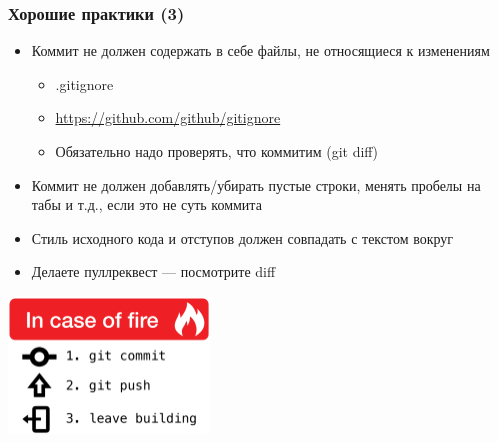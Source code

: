 \documentclass{../../slides-style}
\begin{document}
    \begin{frame}
        \frametitle{Хорошие практики (3)}
        \begin{itemize}
            \item Коммит не должен содержать в себе файлы, не относящиеся к изменениям
            \begin{itemize}
                \item .gitignore
                \item \url{https://github.com/github/gitignore}
                \item Обязательно надо проверять, что коммитим (git diff)
            \end{itemize}
            \item Коммит не должен добавлять/убирать пустые строки, менять пробелы на табы и т.д., если это не суть коммита
            \item Стиль исходного кода и отступов должен совпадать с текстом вокруг
            \item Делаете пуллреквест --- посмотрите diff
        \end{itemize}
        \begin{center}
            \includegraphics[width=0.4\textwidth]{inCaseOfFire.png}
        \end{center}
    \end{frame}
\end{document}
